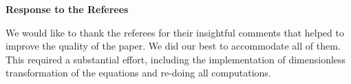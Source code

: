 \documentclass[mathpazo]{cicp}
\begin{document}

\begin{center}
{\huge \bf Response to the Referees}
\end{center}








\vspace{4mm}

We would like to thank the referees for their insightful comments 
that helped to improve the quality of the paper. We did our best to 
accommodate all of them. This required a substantial effort,
including the implementation of dimensionless transformation of 
the equations and re-doing all computations.
\end{document}
